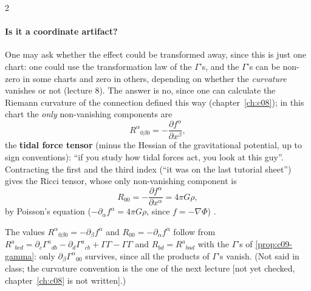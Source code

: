 \begin{paracol}{2}
\paragraph{Is it a coordinate artifact?} One may ask whether the effect could be transformed away, since this is just one chart: one could use the transformation law of the $\Gamma$'s, and the $\Gamma$'s can be non-zero in some charts and zero in others, depending on whether the \emph{curvature} vanishes or not (lecture 8). The answer is no, since one can calculate the Riemann curvature of the connection defined this way (chapter~\ref{ch:c08}); in this chart the \emph{only} non-vanishing components are
\[
  R^\alpha{}_{0\beta0}=-\frac{\partial f^\alpha}{\partial x^\beta},
\]
the \textbf{tidal force tensor} (minus the Hessian of the gravitational potential, up to sign conventions): ``if you study how tidal forces act, you look at this guy''. Contracting the first and the third index (``it was on the last tutorial sheet'') gives the Ricci tensor, whose only non-vanishing component is
\[
  R_{00}=-\frac{\partial f^\alpha}{\partial x^\alpha}=4\pi G\rho,
\]
by Poisson's equation ($-\partial_\alpha f^\alpha=4\pi G\rho$, since $f=-\nabla\Phi$)
.
\begin{coursenote}[Conventions]
The values $R^\alpha{}_{0\beta0}=-\partial_\beta f^\alpha$ and $R_{00}=-\partial_\alpha f^\alpha$ follow from $R^a{}_{bcd}=\partial_c\Gamma^a{}_{db}-\partial_d\Gamma^a{}_{cb}+\Gamma\Gamma-\Gamma\Gamma$ and $R_{bd}=R^a{}_{bad}$ with the $\Gamma$'s of \cref{prop:c09-gamma}: only $\partial_\beta\Gamma^\alpha{}_{00}$ survives, since all the products of $\Gamma$'s vanish. (Not said in class; the curvature convention is the one of the next lecture [not yet checked, chapter~\ref{ch:c08} is not written].)
\end{coursenote}


\end{paracol}
